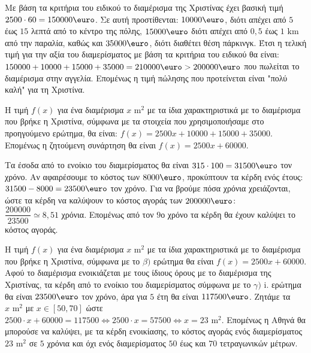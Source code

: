 
\begin{alist}
\item Με βάση τα κριτήρια του ειδικού το διαμέρισμα της Χριστίνας έχει βασική τιμή $2500 \cdot 60 = 150000\text{\euro}$. Σε αυτή προστίθενται: $10000\text{\euro}$, διότι απέχει από $5$ έως $15$ λεπτά από το κέντρο της πόλης, $15000\text{\euro}$ διότι απέχει από $0,5$ έως $1\text{ km}$ από την παραλία, καθώς και $35000\text{\euro}$, διότι διαθέτει θέση πάρκινγκ. Έτσι η τελική τιμή για την αξία του διαμερίσματος με βάση τα κριτήρια του ειδικού θα είναι:
$150000 + 10000 + 15000 + 35000 = 210000\text{\euro} > 200000\text{\euro}$ που πωλείται το διαμέρισμα στην αγγελία. Επομένως η τιμή πώλησης που προτείνεται είναι "πολύ καλή" για τη Χριστίνα.

\item Η τιμή $f(x)$ για ένα διαμέρισμα $x\text{ m}^2$ με τα ίδια χαρακτηριστικά με το διαμέρισμα που βρήκε η Χριστίνα, σύμφωνα με τα στοιχεία που χρησιμοποιήσαμε στο προηγούμενο ερώτημα, θα είναι: $f(x) = 2500x + 10000 + 15000 + 35000$. Επομένως η ζητούμενη συνάρτηση θα είναι $f(x) = 2500x + 60000$.

\item
\begin{rlist}
\item Τα έσοδα από το ενοίκιο του διαμερίσματος θα είναι $315 \cdot 100 = 31500\text{\euro}$ τον χρόνο. Αν αφαιρέσουμε το κόστος των $8000\text{\euro}$, προκύπτουν τα κέρδη ενός έτους:
$31500 - 8000 = 23500\text{\euro}$ τον χρόνο. Για να βρούμε πόσα χρόνια χρειάζονται, ώστε τα κέρδη να καλύψουν το κόστος αγοράς των $200000\text{\euro}$:\\
  $\dfrac{200000}{23500} \simeq 8,51$ χρόνια.
Επομένως από τον $9$ο χρόνο τα κέρδη θα έχουν καλύψει το κόστος αγοράς.
\item Η τιμή $f(x)$ για ένα διαμέρισμα $x\text{ m}^2$ με τα ίδια χαρακτηριστικά με το διαμέρισμα που βρήκε η Χριστίνα, σύμφωνα με το $\beta)$ ερώτημα θα είναι $f(x) = 2500x + 60000$. Αφού το διαμέρισμα ενοικιάζεται με τους ίδιους όρους με το διαμέρισμα της Χριστίνας, τα κέρδη από το ενοίκιο του διαμερίσματος σύμφωνα με το $\gamma)$ i. ερώτημα θα είναι $23500\text{\euro}$ τον χρόνο, άρα για $5$ έτη θα είναι $117500\text{\euro}$.
Ζητάμε τα $x\text{ m}^2$ με $x \in [50, 70]$ ώστε $2500 \cdot x + 60000 = 117500 \Leftrightarrow 2500 \cdot x = 57500 \Leftrightarrow x = 23\text{ m}^2$. Επομένως η Αθηνά θα μπορούσε να καλύψει, με τα κέρδη ενοικίασης, το κόστος αγοράς ενός διαμερίσματος $23\text{ m}^2$ σε $5$ χρόνια και όχι ενός διαμερίσματος $50$ έως και $70$ τετραγωνικών μέτρων.
\end{rlist}
\end{alist}

